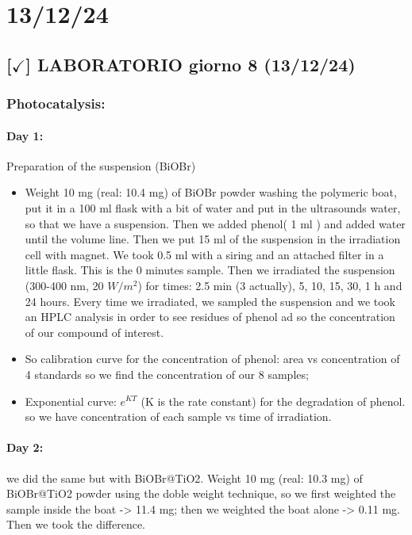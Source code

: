 \section{13/12/24}

\subsection{[$\checkmark$] LABORATORIO giorno 8 (13/12/24)}

\subsubsection{Photocatalysis: }

\paragraph{Day 1:} 
Preparation of the suspension (BiOBr)
\begin{itemize}
    \item Weight 10 mg (real: 10.4 mg) of BiOBr powder washing the polymeric boat, put it in a 100 ml flask with a bit of water and put in the ultrasounds water, so that we have a suspension. Then we added phenol( 1 ml ) and added water until the volume line. Then we put 15 ml of the suspension in the irradiation cell with magnet. We took 0.5 ml with a siring and an attached filter in a little flask. This is the 0 minutes sample. Then we irradiated the suspension (300-400 nm, 20 $W/m^2$) for times: 2.5 min (3 actually), 5, 10, 15, 30, 1 h and 24 hours. Every time we irradiated, we sampled the suspension and we took an HPLC analysis in order to see residues of phenol ad so the concentration of our compound of interest.
    
    \item So calibration curve for the concentration of phenol: area vs concentration of 4 standards so we find the concentration of our 8 samples;
    \item Exponential curve: $e^{KT}$ (K is the rate constant) for the degradation of phenol. so we have concentration of each sample vs time of irradiation.
\end{itemize}

\paragraph{Day 2:} 
we did the same but with BiOBr@TiO2. Weight 10 mg (real: 10.3 mg) of BiOBr@TiO2 powder using the doble weight technique, so we first weighted the sample inside the boat -> 11.4 mg; then we weighted the boat alone -> 0.11 mg. Then we took the difference. 

